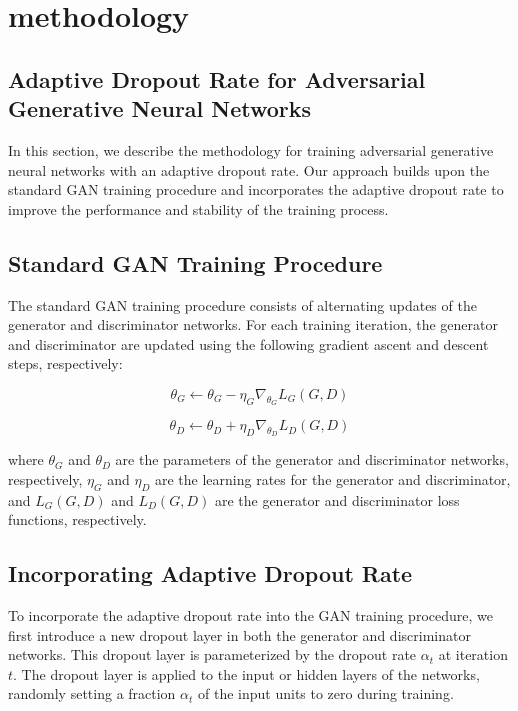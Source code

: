 \section{methodology}
\subsection{Adaptive Dropout Rate for Adversarial Generative Neural Networks}
In this section, we describe the methodology for training adversarial generative neural networks with an adaptive dropout rate. Our approach builds upon the standard GAN training procedure and incorporates the adaptive dropout rate to improve the performance and stability of the training process.

\subsection{Standard GAN Training Procedure}
The standard GAN training procedure consists of alternating updates of the generator and discriminator networks. For each training iteration, the generator and discriminator are updated using the following gradient ascent and descent steps, respectively:

\begin{equation}
\theta_G \leftarrow \theta_G - \eta_G \nabla_{\theta_G} L_G(G, D)
\end{equation}

\begin{equation}
\theta_D \leftarrow \theta_D + \eta_D \nabla_{\theta_D} L_D(G, D)
\end{equation}

where $\theta_G$ and $\theta_D$ are the parameters of the generator and discriminator networks, respectively, $\eta_G$ and $\eta_D$ are the learning rates for the generator and discriminator, and $L_G(G, D)$ and $L_D(G, D)$ are the generator and discriminator loss functions, respectively.

\subsection{Incorporating Adaptive Dropout Rate}
To incorporate the adaptive dropout rate into the GAN training procedure, we first introduce a new dropout layer in both the generator and discriminator networks. This dropout layer is parameterized by the dropout rate $\alpha_t$ at iteration $t$. The dropout layer is applied to the input or hidden layers of the networks, randomly setting a fraction $\alpha_t$ of the input units to zero during training.

